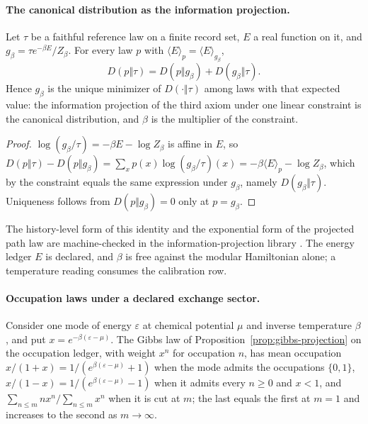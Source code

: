 \paragraph{The canonical distribution as the information projection.}

\begin{proposition}
\label{prop:gibbs-projection}
Let \(\tau\) be a faithful reference law on a finite record set, \(E\) a
real function on it, and \(g_\beta=\tau e^{-\beta E}/Z_\beta\). For every
law \(p\) with \(\langle E\rangle_p=\langle E\rangle_{g_\beta}\),
\[
 D(p\Vert\tau)=D(p\Vert g_\beta)+D(g_\beta\Vert\tau).
\]
Hence \(g_\beta\) is the unique minimizer of \(D(\cdot\Vert\tau)\) among
laws with that expected value: the information projection of the third
axiom under one linear constraint is the canonical distribution, and
\(\beta\) is the multiplier of the constraint.
\end{proposition}

\begin{proof}
\(\log(g_\beta/\tau)=-\beta E-\log Z_\beta\) is affine in \(E\), so
\(D(p\Vert\tau)-D(p\Vert g_\beta)=\sum_x p(x)\log(g_\beta/\tau)(x)
=-\beta\langle E\rangle_p-\log Z_\beta\), which by the constraint equals
the same expression under \(g_\beta\), namely \(D(g_\beta\Vert\tau)\).
Uniqueness follows from \(D(p\Vert g_\beta)=0\) only at \(p=g_\beta\).
\end{proof}

The history-level form of this identity and the exponential form of the
projected path law are machine-checked in the information-projection
library \cite{ophrepo}. The energy ledger \(E\) is declared, and \(\beta\)
is free against the modular Hamiltonian alone; a temperature reading
consumes the calibration row.

\paragraph{Occupation laws under a declared exchange sector.}

\begin{proposition}
\label{prop:occupation-laws}
Consider one mode of energy \(\varepsilon\) at chemical potential \(\mu\)
and inverse temperature \(\beta\), and put \(x=e^{-\beta(\varepsilon-\mu)}\).
The Gibbs law of Proposition~\ref{prop:gibbs-projection} on the occupation
ledger, with weight \(x^n\) for occupation \(n\), has mean occupation
\(x/(1+x)=1/(e^{\beta(\varepsilon-\mu)}+1)\) when the mode admits the
occupations \(\{0,1\}\), \(x/(1-x)=1/(e^{\beta(\varepsilon-\mu)}-1)\) when
it admits every \(n\ge0\) and \(x<1\), and
\(\sum_{n\le m}nx^n/\sum_{n\le m}x^n\) when it is cut at \(m\); the last
equals the first at \(m=1\) and increases to the second as \(m\to\infty\).
\end{proposition}

